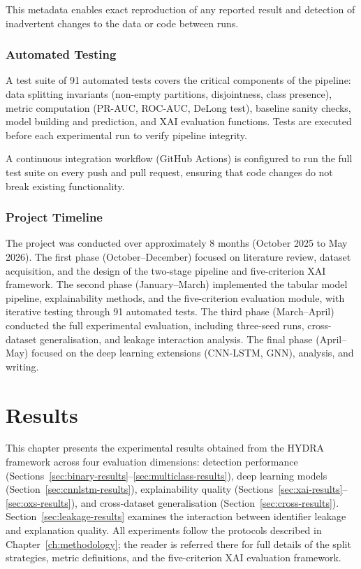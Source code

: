 \documentclass[12pt,a4paper]{report}
\begin{document}
This metadata enables exact reproduction of any reported result and detection of inadvertent changes to the data or code between runs.

\subsection{Automated Testing}
\label{sec:testing}

A test suite of 91 automated tests covers the critical components of the pipeline: data splitting invariants (non-empty partitions, disjointness, class presence), metric computation (PR-AUC, ROC-AUC, DeLong test), baseline sanity checks, model building and prediction, and XAI evaluation functions. Tests are executed before each experimental run to verify pipeline integrity.

A continuous integration workflow (GitHub Actions) is configured to run the full test suite on every push and pull request, ensuring that code changes do not break existing functionality.

\subsection{Project Timeline}
\label{sec:timeline}

The project was conducted over approximately 8 months (October 2025 to May 2026). The first phase (October--December) focused on literature review, dataset acquisition, and the design of the two-stage pipeline and five-criterion XAI framework. The second phase (January--March) implemented the tabular model pipeline, explainability methods, and the five-criterion evaluation module, with iterative testing through 91 automated tests. The third phase (March--April) conducted the full experimental evaluation, including three-seed runs, cross-dataset generalisation, and leakage interaction analysis. The final phase (April--May) focused on the deep learning extensions (CNN-LSTM, GNN), analysis, and writing.

\chapter{Results}
\label{ch:results}

This chapter presents the experimental results obtained from the HYDRA framework across four evaluation dimensions: detection performance (Sections~\ref{sec:binary-results}--\ref{sec:multiclass-results}), deep learning models (Section~\ref{sec:cnnlstm-results}), explainability quality (Sections~\ref{sec:xai-results}--\ref{sec:oxs-results}), and cross-dataset generalisation (Section~\ref{sec:cross-results}). Section~\ref{sec:leakage-results} examines the interaction between identifier leakage and explanation quality. All experiments follow the protocols described in Chapter~\ref{ch:methodology}; the reader is referred there for full details of the split strategies, metric definitions, and the five-criterion XAI evaluation framework.
\end{document}
